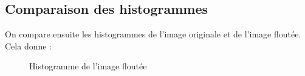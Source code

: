 \documentclass[french,a4paper,10pt]{article}
\begin{document}
    \subsection{Comparaison des histogrammes}\label{subsec:5.2}

    On compare ensuite les histogrammes de l'image originale et de l'image floutée.
    Cela donne :
    \begin{figure}[!htb]
        \centering
        \caption{Histogramme de l'image floutée}\label{Fig:histo-peppers-ffc}
    \end{figure}
\end{document}
